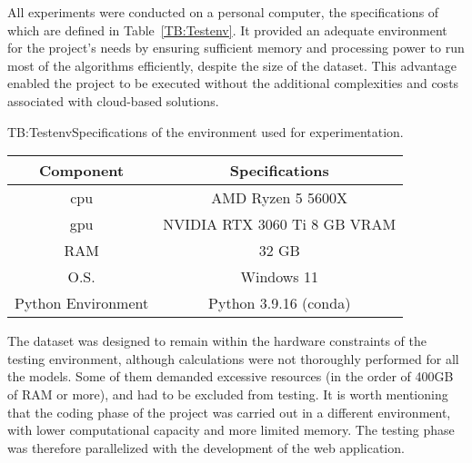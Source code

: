 All experiments were conducted on a personal computer, the specifications of which are defined in Table~\ref{TB:Testenv}. It provided an adequate environment for the project's needs by ensuring sufficient memory and processing power to run most of the algorithms efficiently, despite the size of the dataset. This advantage enabled the project to be executed without the additional complexities and costs associated with cloud-based solutions.

\vspace{0.5em}

\begin{table}[Testing environment specifications]{TB:Testenv}{Specifications of the environment used for experimentation.}
  \small
    \begin{tabular}{c c}
      \hline
      \textbf{Component} & \textbf{Specifications} \\
      \hline
      \hline
      \acs{cpu} & AMD Ryzen 5 5600X \\
      \acs{gpu} & NVIDIA RTX 3060 Ti 8 GB VRAM  \\
      RAM & 32 GB \\
      O.S. & Windows 11 \\
      Python Environment & Python 3.9.16 (conda) \\
      \hline
  \end{tabular}
\end{table}

The dataset was designed to remain within the hardware constraints of the testing environment, although calculations were not thoroughly performed for all the models. Some of them demanded excessive resources (in the order of 400GB of RAM or more), and had to be excluded from testing. It is worth mentioning that the coding phase of the project was carried out in a different environment, with lower computational capacity and more limited memory. The testing phase was therefore parallelized with the development of the web application.